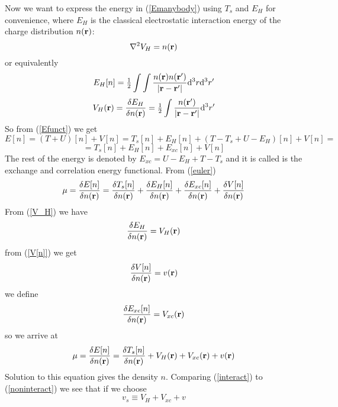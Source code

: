 Now we want to express the energy in (\ref{Emanybody}) using $T_s$ and $E_H$ for convenience, where $E_H$ is the classical electrostatic interaction energy of the charge distribution $n({\bf r})$: 
\begin{equation*}
  \nabla^2 V_H=n({\bf r})
\end{equation*}
or equivalently 
\begin{equation*}
  E_H[n]={\textstyle{1\over2}}\int\int {n({\bf r})n({\bf r'})\over|{\bf r}-{\bf r'}|} {\rm d}^3r{\rm d}^3r'
\end{equation*}
\begin{equation}
  V_H({\bf r})={\delta E_H\over\delta n({\bf r})}={\textstyle{1\over2}}\int {n({\bf r'})\over|{\bf r}-{\bf r'}|} {\rm d}^3r'  \label{V_H}
\end{equation}
So from (\ref{Efunct}) we get 
\begin{equation*}
  E[n]=(T+U)[n]+V[n]=T_s[n]+E_H[n]+(T-T_s+U-E_H)[n]+V[n]=
\end{equation*}
\begin{equation}
  =T_s[n]+E_H[n]+E_{xc}[n]+V[n]  \label{Efunctxc}
\end{equation}
The rest of the energy is denoted by $E_{xc}=U-E_H+T-T_s$ and it is called is the exchange and correlation energy functional. From (\ref{euler})
\begin{equation*}
  \mu={\delta E[n]\over\delta n({\bf r})}= {\delta T_s[n]\over\delta n({\bf r})}+ {\delta E_H[n]\over\delta n({\bf r})}+ {\delta E_{xc}[n]\over\delta n({\bf r})}+ {\delta V[n]\over\delta n({\bf r})}
\end{equation*}
From (\ref{V_H}) we have 
\begin{equation*}
  {\delta E_H\over\delta n({\bf r})}=V_H({\bf r})
\end{equation*}
from (\ref{V[n]}) we get 
\begin{equation*}
  {\delta V[n]\over\delta n({\bf r})}=v({\bf r})
\end{equation*}
we define 
\begin{equation}
  {\delta E_{xc}[n]\over\delta n({\bf r})}=V_{xc}({\bf r})  \label{Vxcpot}
\end{equation}
so we arrive at 
\begin{equation}
  \mu={\delta E[n]\over\delta n({\bf r})}= {\delta T_s[n]\over\delta n({\bf r})}+V_H({\bf r})+V_{xc}({\bf r})+v({\bf r})  \label{interact}
\end{equation}
Solution to this equation gives the density $n$. Comparing (\ref{interact}) to (\ref{noninteract}) we see that if we choose 
\begin{equation*}
  v_s\equiv V_H+V_{xc}+v
\end{equation*}
